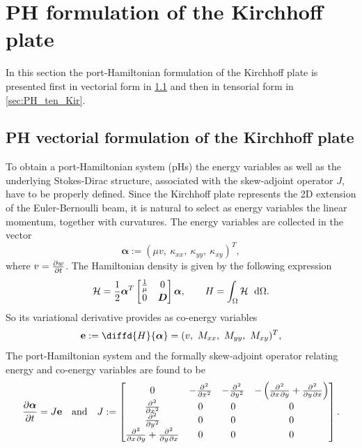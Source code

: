 \documentclass[preprint,12pt]{elsarticle}
\begin{document}
	\section{PH formulation of the Kirchhoff plate}
	In this section the port-Hamiltonian formulation of the Kirchhoff plate is presented first in vectorial form  in \ref{sec:PH_vec_Kir} and then in tensorial form in \ref{sec:PH_ten_Kir}.
	
	\subsection{PH vectorial formulation of the Kirchhoff plate}
	\label{sec:PH_vec_Kir}
	
	To obtain a port-Hamiltonian system (pHs) the energy variables as well as the underlying Stokes-Dirac structure, associated with the skew-adjoint operator $J$, have to be properly defined. Since the Kirchhoff plate represents the 2D extension of the Euler-Bernoulli beam, it is natural to select as energy variables the linear momentum, together with curvatures. The energy variables are collected in the vector
	\begin{equation}
	\bm{\alpha} := (\mu v,\ \kappa_{xx},\ \kappa_{yy},\ \kappa_{xy})^T,
	\end{equation}
	where $v = \diffp{w}{t}$. The Hamiltonian density is given by the following expression
	\begin{equation}
	\label{eq:H_kir}
	\mathcal{H} = \frac{1}{2} \bm{\alpha}^T \begin{bmatrix}
	\frac{1}{\mu} & 0 \\
	0 & \bm{D} \\
	\end{bmatrix} \bm{\alpha},  \qquad H = \int_{\Omega} \mathcal{H} \ \d{\Omega}.
	\end{equation}
	So its variational derivative provides as co-energy variables
	\begin{equation}
	\mathbf{e} := \diffd{H}{\bm{\alpha}} = (v,\ M_{xx},\ M_{yy},\ M_{xy})^T,
	\end{equation}
	The port-Hamiltonian system and the formally skew-adjoint operator relating energy and co-energy variables are found to be
	\begin{equation}
	\label{eq:PH_Kirchh}
	\diffp{\bm{\alpha}}{t} = J \mathbf{e} \quad \text{and} \quad J := 
	\begin{bmatrix}
	0 & -\diffp[2]{}{x} & -\diffp[2]{}{y} & - \left(\diffp{}{x,y} + \diffp{}{y,x} \right)\\
	\diffp[2]{}{x} & 0 & 0 & 0 \\
	\diffp[2]{}{y} & 0 & 0 & 0 \\
	\diffp{}{x,y} +  \diffp{}{y,x} & 0 & 0 & 0 \\
	\end{bmatrix}.
	\end{equation}
\end{document}
